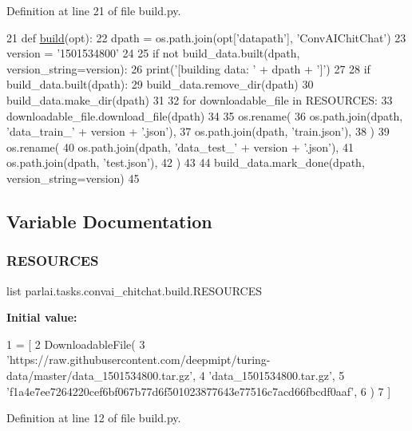 Definition at line 21 of file build.\+py.


\begin{DoxyCode}
21 \textcolor{keyword}{def }\hyperlink{namespacedialog__babi__feedback_1_1build_a7a9d289f7493a5ded13c4b7f071b6184}{build}(opt):
22     dpath = os.path.join(opt[\textcolor{stringliteral}{'datapath'}], \textcolor{stringliteral}{'ConvAIChitChat'})
23     version = \textcolor{stringliteral}{'1501534800'}
24 
25     \textcolor{keywordflow}{if} \textcolor{keywordflow}{not} build\_data.built(dpath, version\_string=version):
26         print(\textcolor{stringliteral}{'[building data: '} + dpath + \textcolor{stringliteral}{']'})
27 
28         \textcolor{keywordflow}{if} build\_data.built(dpath):
29             build\_data.remove\_dir(dpath)
30         build\_data.make\_dir(dpath)
31 
32         \textcolor{keywordflow}{for} downloadable\_file \textcolor{keywordflow}{in} RESOURCES:
33             downloadable\_file.download\_file(dpath)
34 
35         os.rename(
36             os.path.join(dpath, \textcolor{stringliteral}{'data\_train\_'} + version + \textcolor{stringliteral}{'.json'}),
37             os.path.join(dpath, \textcolor{stringliteral}{'train.json'}),
38         )
39         os.rename(
40             os.path.join(dpath, \textcolor{stringliteral}{'data\_test\_'} + version + \textcolor{stringliteral}{'.json'}),
41             os.path.join(dpath, \textcolor{stringliteral}{'test.json'}),
42         )
43 
44         build\_data.mark\_done(dpath, version\_string=version)
45 \end{DoxyCode}


\subsection{Variable Documentation}
\mbox{\label{namespaceparlai_1_1tasks_1_1convai__chitchat_1_1build_a687e95f80a9c6975e5ad72cb5ff3c93b}} 
\subsubsection{\texorpdfstring{R\+E\+S\+O\+U\+R\+C\+ES}{RESOURCES}}
{\footnotesize\ttfamily list parlai.\+tasks.\+convai\+\_\+chitchat.\+build.\+R\+E\+S\+O\+U\+R\+C\+ES}

{\bfseries Initial value\+:}
\begin{DoxyCode}
1 =  [
2     DownloadableFile(
3         \textcolor{stringliteral}{'https://raw.githubusercontent.com/deepmipt/turing-data/master/data\_1501534800.tar.gz'},
4         \textcolor{stringliteral}{'data\_1501534800.tar.gz'},
5         \textcolor{stringliteral}{'f1a4e7ee7264220cef6bf067b77d6f501023877643e77516c7acd66fbcdf0aaf'},
6     )
7 ]
\end{DoxyCode}


Definition at line 12 of file build.\+py.

